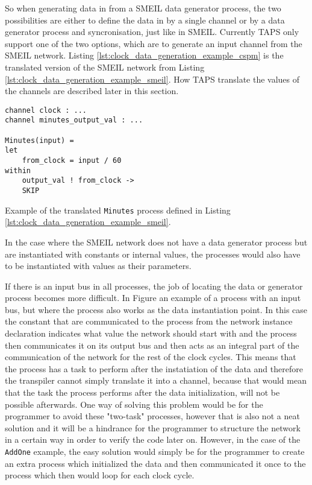 So when generating data in \cspm{} from a SMEIL data generator process, the two possibilities are either to define the data in \cspm by a single channel or by a data generator process and syncronisation, just like in SMEIL.
Currently TAPS only support one of the two options, which are to generate an input channel from the SMEIL network.
Listing \ref{lst:clock_data_generation_example_cspm} is the translated version of the SMEIL network from Listing \ref{lst:clock_data_generation_example_smeil}. How TAPS translate the values of the channels are described later in this section. 
\begin{listing}
\begin{verbatim}
channel clock : ...
channel minutes_output_val : ...

Minutes(input) =
let
    from_clock = input / 60
within
    output_val ! from_clock ->
    SKIP
\end{verbatim}
\caption{Example of the translated \texttt{Minutes} process defined in Listing \ref{lst:clock_data_generation_example_smeil}.}
\label{lst:channel_range_cspm}
\end{listing}


In the case where the SMEIL network does not have a data generator process but are instantiated with constants or internal values, the \cspm processes would also have to be instantiated with values as their parameters.


If there is an input bus in all processes, the job of locating the data or generator process becomes more difficult. In Figure %
an example of a process with an input bus, but where the process also works as the data instantiation point. In this case the constant that are communicated to the process from the network instance declaration indicates what value the network should start with and the process then communicates it on its output bus and then acts as an integral part of the communication of the network for the rest of the clock cycles. This means that the process has a task to perform after the instatiation of the data and therefore the transpiler cannot simply translate it into a \cspm channel, because that would mean that the task the process performs after the data initialization, will not be possible afterwards. One way of solving this problem would be for the programmer to avoid these "two-task" processes, however that is also not a neat solution and it will be a hindrance for the programmer to structure the network in a certain way in order to verify the code later on. However, in the case of the \texttt{AddOne} example, the easy solution would simply be for the programmer to create an extra process which initialized the data and then communicated it once to the process which then would loop for each clock cycle.

